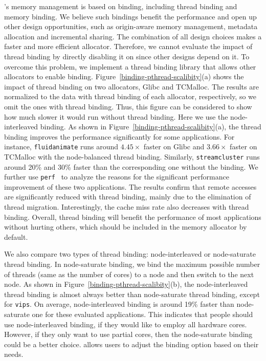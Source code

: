\NM{}'s memory management is based on binding, including thread binding and memory binding. We believe such bindings benefit the performance and open up other design opportunities, such as origin-aware memory management, metadata allocation and incremental sharing. The combination of all design choices makes \NM{} a faster and more efficient allocator. Therefore, we cannot evaluate the impact of thread binding by directly disabling it on \NM{} since other designs depend on it. To overcome this problem, we implement a thread binding library that allows other allocators to enable binding.
Figure~\ref{binding-pthread-scalibity}(a) shows the impact of thread binding on two allocators, Glibc and TCMalloc.
The results are normalized to the data with thread binding of each allocator, respectively, so we omit the ones with thread binding. Thus, this figure can be considered to show how much slower it would run without thread binding.
Here we use the node-interleaved binding. As shown in Figure~\ref{binding-pthread-scalibity}(a), the thread binding improves the performance significantly for some applications. For instance, \texttt{fluidanimate} runs around $4.45\times$ faster on Glibc and $3.66\times$ faster on TCMalloc with the node-balanced thread binding. Similarly, \texttt{streamcluster} runs around 20\% and 30\% faster than the corresponding one without the binding. 
We further use \texttt{perf}~\cite{perfweb} to analyze the reasons for the significant performance improvement of these two applications. The results confirm that remote accesses are significantly reduced with thread binding, mainly due to the elimination of thread migration. Interestingly, the cache miss rate also decreases with thread binding. Overall, thread binding will benefit the performance of most applications without hurting others,
which should be included in the memory allocator by default. 


We also compare two types of thread binding: node-interleaved or node-saturate thread binding. In node-saturate binding, we bind the maximum possible number of threads (same as the number of cores) to a node and then switch to the next node. As shown in Figure~\ref{binding-pthread-scalibity}(b), the node-interleaved thread binding is almost always better than node-saturate thread binding, except for \texttt{vips}. On average, node-interleaved binding is around 19\% faster than node-saturate one for these evaluated applications. This indicates that people should use node-interleaved binding, if they would like to employ all hardware cores. However, if they only want to use partial cores, then the node-saturate binding could be a better choice. \NM{} allows users to adjust the binding option based on their needs.


